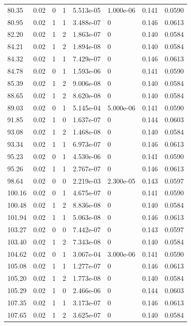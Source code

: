 \documentclass[preview]{standalone}
\begin{document}
{{{\begin{tabular}{L{1.2cm}C{1.2cm} C{0.3cm}C{0.5cm} C{1.4cm}C{1.4cm} C{1.4cm}C{1.4cm}}
  80.35  &  0.02  & 0     &  1 &  5.513e-05  & 1.000e-06  & 0.141 &  0.0590   \\ 
  80.95  &  0.02  & 1     &  1 &  3.488e-07  & 0  & 0.146 &  0.0613   \\ 
  82.20  &  0.02  & 1     &  2 &  1.863e-07  & 0  & 0.140 &  0.0584   \\ 
  84.21  &  0.02  & 1     &  2 &  1.894e-08  & 0  & 0.140 &  0.0584   \\ 
  84.32  &  0.02  & 1     &  1 &  7.429e-07  & 0  & 0.146 &  0.0613   \\ 
  84.78  &  0.02  & 0     &  1 &  1.593e-06  & 0  & 0.141 &  0.0590   \\ 
  85.39  &  0.02  & 1     &  2 &  9.006e-08  & 0  & 0.140 &  0.0584   \\ 
  88.65  &  0.02  & 1     &  2 &  8.620e-08  & 0  & 0.140 &  0.0584   \\ 
  89.03  &  0.02  & 0     &  1 &  5.145e-04  & 5.000e-06  & 0.141 &  0.0590   \\ 
  91.85  &  0.02  & 1     &  0 &  1.637e-07  & 0  & 0.144 &  0.0603   \\ 
  93.08  &  0.02  & 1     &  2 &  1.468e-08  & 0  & 0.140 &  0.0584   \\ 
  93.34  &  0.02  & 1     &  1 &  6.973e-07  & 0  & 0.146 &  0.0613   \\ 
  95.23  &  0.02  & 0     &  1 &  4.530e-06  & 0  & 0.141 &  0.0590   \\ 
  95.26  &  0.02  & 1     &  1 &  2.767e-07  & 0  & 0.146 &  0.0613   \\ 
  98.64  &  0.02  & 0     &  0 &  2.219e-03  & 2.300e-05  & 0.143 &  0.0597   \\ 
  100.16  &  0.02  & 0     &  1 &  4.675e-07  & 0  & 0.141 &  0.0590   \\ 
  100.48  &  0.02  & 1     &  2 &  8.836e-08  & 0  & 0.140 &  0.0584   \\ 
  101.94  &  0.02  & 1     &  1 &  5.063e-08  & 0  & 0.146 &  0.0613   \\ 
  103.27  &  0.02  & 0     &  0 &  7.442e-07  & 0  & 0.143 &  0.0597   \\ 
  103.40  &  0.02  & 1     &  2 &  7.343e-08  & 0  & 0.140 &  0.0584   \\ 
  104.62  &  0.02  & 0     &  1 &  3.067e-04  & 3.000e-06  & 0.141 &  0.0590   \\ 
  105.08  &  0.02  & 1     &  1 &  1.277e-07  & 0  & 0.146 &  0.0613   \\ 
  105.20  &  0.02  & 1     &  2 &  1.773e-08  & 0  & 0.140 &  0.0584   \\ 
  105.29  &  0.02  & 1     &  0 &  2.466e-06  & 0  & 0.144 &  0.0603   \\ 
  107.35  &  0.02  & 1     &  1 &  3.173e-07  & 0  & 0.146 &  0.0613   \\ 
  107.65  &  0.02  & 1     &  2 &  3.625e-07  & 0  & 0.140 &  0.0584   \\ 
\hline 
\end{tabular} 

}}}
\end{document}

